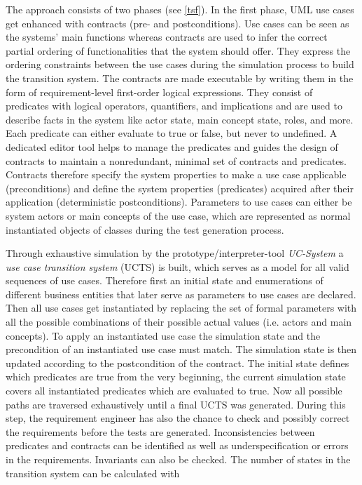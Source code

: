 The approach consists of two phases (see \autoref{tsf}). In the first phase, UML use cases get enhanced with contracts (pre- and postconditions). Use cases can be seen as the systems' main functions whereas contracts are used to infer the correct partial ordering of functionalities that the system should offer. They express the ordering constraints between the use cases during the simulation process to build the transition system. The contracts are made executable by writing them in the form of requirement-level first-order logical expressions. They consist of predicates with logical operators, quantifiers, and implications and are used to describe facts in the system like actor state, main concept state, roles, and more. Each predicate can either evaluate to true or false, but never to undefined. A dedicated editor tool helps to manage the predicates and guides the design of contracts to maintain a nonredundant, minimal set of contracts and predicates. Contracts therefore specify the system properties to make a use case applicable (preconditions) and define the system properties (predicates) acquired after their application (deterministic postconditions). Parameters to use cases can either be system actors or main concepts of the use case, which are represented as normal instantiated objects of classes during the test generation process. 

Through exhaustive simulation by the prototype/interpreter-tool \textit{UC-System} a \textit{use case transition system} (UCTS) is built, which serves as a model for all valid sequences of use cases. Therefore first an initial state and enumerations of different business entities that later serve as parameters to use cases are declared. Then all use cases get instantiated by replacing the set of formal parameters with all the possible combinations of their possible actual values (i.e. actors and main concepts). To apply an instantiated use case the simulation state and the precondition of an instantiated use case must match. The simulation state is then updated according to the postcondition of the contract. The initial state defines which predicates are true from the very beginning, the current simulation state covers all instantiated predicates which are evaluated to true. Now all possible paths are traversed exhaustively until a final UCTS was generated. During this step, the requirement engineer has also the chance to check and possibly correct the requirements before the tests are generated. Inconsistencies between predicates and contracts can be identified as well as underspecification or errors in the requirements. Invariants can also be checked. The number of states in the transition system can be calculated with

